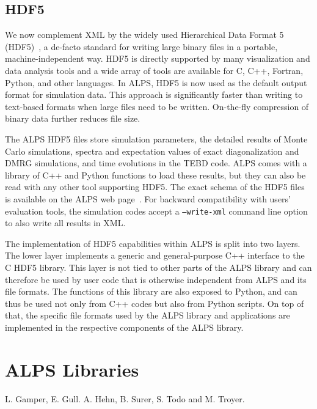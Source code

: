 \documentclass[12pt]{iopart}
\begin{document}
\subsection{HDF5}

We now complement XML by the widely used Hierarchical Data Format 5 (HDF5)~\cite{hdf5}, a de-facto standard for writing large binary files in a portable, machine-independent way. HDF5 is directly supported by many visualization and data analysis tools and a       wide array of tools are 
available for C, C++, Fortran, Python, and other languages. In ALPS, HDF5 is now used as the default output format for simulation data. This approach is significantly faster than writing to text-based formats when large files need to be written. On-the-fly compression of binary data further reduces file size. 

The ALPS HDF5 files store simulation parameters, the detailed results of Monte Carlo simulations, spectra and expectation values of exact diagonalization and DMRG simulations, and time evolutions in the TEBD code. ALPS comes with a library of C++ and Python functions to load these results, but they can also be read with any other tool supporting HDF5. The exact schema of the HDF5 files is available on the ALPS web page~\cite{alps}. For backward compatibility with users' evaluation tools, the simulation codes accept a {\tt --write-xml} command line option to also write all results in XML.

The implementation of HDF5 capabilities within ALPS is split into two layers. The lower layer implements a generic and general-purpose C++ interface to the C HDF5 library. This layer is not tied to other parts of the ALPS library and can therefore be used by user code that is otherwise independent from ALPS and its file formats. The functions of this library are also exposed to Python, and can thus be used not only from C++ codes but also from Python scripts. On top of that, the specific file formats used by the ALPS library and applications are implemented in the respective components of the ALPS library.




\section{ALPS Libraries}
 L. Gamper, E. Gull. A. Hehn, B. Surer, S. Todo and M. Troyer. 

\medskip
\end{document}
